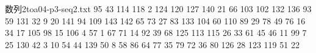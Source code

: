 \documentclass{beamer}
\begin{document}
\begin{frame}[fragile]{数列2}{toa04-p3-seq2.txt}
95
43
114
118
2
124
120
127
140
21
66
103
102
132
136
93
59
131
32
9
20
141
94
109
143
142
65
73
27
83
133
104
60
110
89
29
78
49
76
16
34
17
105
98
15
106
4
57
1
67
71
14
92
39
68
125
113
115
26
33
61
45
46
11
99
7
25
130
42
3
10
54
44
139
50
8
58
86
64
77
35
79
72
36
80
126
28
123
119
51
22
\end{frame}
\end{document}
